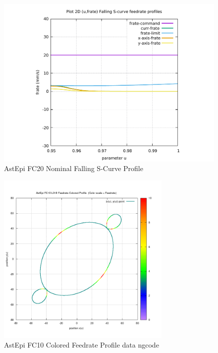 \begin{figure}
	\caption     {AstEpi FC20 Nominal Falling S-Curve Profile}
	\label{16-img-AstEpi-FC20-Nominal-Falling-S-Curve-Profile.pdf}
\includegraphics[width=1.00\textwidth]{Chap4/appendix/app-AstEpi/plots/16-img-AstEpi-FC20-Nominal-Falling-S-Curve-Profile.pdf}
\end{figure}

\clearpage
\pagebreak

\begin{figure}
	\caption     {AstEpi FC10 Colored Feedrate Profile data ngcode}
	\label{17-img-AstEpi-FC10-Colored-Feedrate-Profile-data_ngcode.png}
\includegraphics[width=0.75\textwidth]{Chap4/appendix/app-AstEpi/plots/17-img-AstEpi-FC10-Colored-Feedrate-Profile-data_ngcode.png}
\end{figure}


